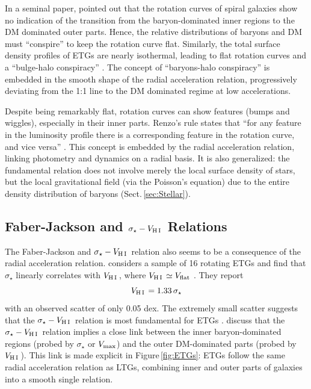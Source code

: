 \documentclass[apjl, twocolappendix]{emulateapj}
\newcommand{\hi } {{\rm H}\,{\small\rm I} \,}
\begin{document}
In a seminal paper, \citet{vanAlbada1986} pointed out that the rotation curves of spiral galaxies show no indication of the transition from the baryon-dominated inner regions to the DM dominated outer parts. Hence, the relative distributions of baryons and DM must ``conspire'' to keep the rotation curve flat. Similarly, the total surface density profiles of ETGs are nearly isothermal, leading to flat rotation curves and a ``bulge-halo conspiracy'' \citep[e.g.,][]{Treu2006, Humphrey2012, Cappellari2015}. The concept of ``baryons-halo conspiracy'' is embedded in the smooth shape of the radial acceleration relation, progressively deviating from the 1:1 line to the DM dominated regime at low accelerations.

Despite being remarkably flat, rotation curves can show features (bumps and wiggles), especially in their inner parts. Renzo's rule states that ``for any feature in the luminosity profile there is a corresponding feature in the rotation curve, and vice versa'' \citep{Sancisi2004}. This concept is embedded by the radial acceleration relation, linking photometry and dynamics on a radial basis. It is also generalized: the fundamental relation does not involve merely the local surface density of stars, but the local gravitational field (via the Poisson's equation) due to the entire density distribution of baryons (Sect.\,\ref{sec:Stellar}).

\subsection{Faber-Jackson and $\sigma_{\star}-V_{\hi}$ Relations}

The Faber-Jackson and $\sigma_{\star}-V_{\hi}$ relation also seems to be a consequence of the radial acceleration relation. \citet{Serra2016} considers a sample of 16 rotating ETGs and find that $\sigma_{\star}$ linearly correlates with $V_{\hi}$, where $V_{\hi}\simeq V_{\rm flat}$ \citep{denHeijer2015}. They report
\begin{equation}
 V_{\hi} = 1.33 \, \sigma_{\star}
\end{equation}
with an observed scatter of only 0.05 dex. The extremely small scatter suggests that the $\sigma_{\star}-V_{\hi}$ relation is most fundamental for ETGs \citep[see also][]{Pizzella2005, Courteau2007}. \citet{Serra2016} discuss that the $\sigma_{\star}-V_{\hi}$ relation implies a close link between the inner baryon-dominated regions (probed by $\sigma_{\star}$ or $V_{\rm max}$) and the outer DM-dominated parts (probed by $V_{\hi}$). This link is made explicit in Figure\,\ref{fig:ETGs}: ETGs follow the same radial acceleration relation as LTGs, combining inner and outer parts of galaxies into a smooth single relation.
\end{document}
